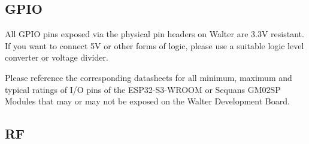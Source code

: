 \documentclass[11pt]{article}
\begin{document}
\subsection{GPIO} \label{gpio}
All GPIO pins exposed via the physical pin headers on Walter are 3.3V resistant. If you want to connect 5V or other forms of logic, please use a suitable logic level converter or voltage divider.\newline

Please reference the corresponding datasheets for all minimum, maximum and typical ratings of I/O pins of the ESP32-S3-WROOM or Sequans GM02SP Modules that may or may not be exposed on the Walter Development Board.
\subsection{RF}
\newpage
\end{document}
